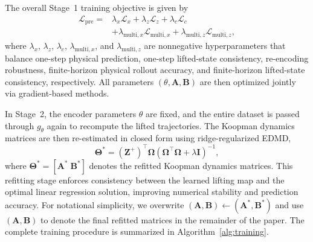 \documentclass[journal]{IEEEtran}
\newcommand{\mA}{\mathbf{A}}
\newcommand{\mB}{\mathbf{B}}
\newcommand{\mZ}{\mathbf{Z}}
\newcommand{\mI}{\mathbf{I}}
\newcommand{\mTheta}{\boldsymbol{\Theta}}
\newcommand{\mOmega}{\boldsymbol{\Omega}}
\begin{document}
{The overall Stage~1 training objective is given by
\begin{equation}
\begin{split}
    \mathcal{L}_{\mathrm{pre}}
    =
    &\lambda_x \mathcal{L}_x
    +
    \lambda_z \mathcal{L}_z
    +
    \lambda_c \mathcal{L}_c \\
    &+
    \lambda_{\mathrm{multi},x}
    \mathcal{L}_{\mathrm{multi},x}
    +
    \lambda_{\mathrm{multi},z}
    \mathcal{L}_{\mathrm{multi},z},
\end{split}
\label{eq:pretraining_loss}
\end{equation}
where $\lambda_x$, $\lambda_z$, $\lambda_c$, $\lambda_{\mathrm{multi},x}$, and $\lambda_{\mathrm{multi},z}$ are nonnegative hyperparameters that balance one-step physical prediction, one-step lifted-state consistency, re-encoding robustness, finite-horizon physical rollout accuracy, and finite-horizon lifted-state consistency, respectively. All parameters $(\theta, \mA, \mB)$ are then optimized jointly via gradient-based methods.}

In Stage~2, the encoder parameters $\theta$ are fixed, and the entire dataset is passed through $g_\theta$ again to recompute the lifted trajectories. The Koopman dynamics matrices are then re-estimated in closed form using ridge-regularized EDMD,
\begin{equation}
    \mTheta^{*} = (\mZ^{+})^\top \mOmega
    \left(\mOmega^\top \mOmega + \lambda \mI\right)^{-1},
\end{equation}
where $\mTheta^{*} = [\mA^{*}\;\mB^{*}]$ denotes the refitted Koopman dynamics matrices. This refitting stage enforces consistency between the learned lifting map and the optimal linear regression solution, improving numerical stability and prediction accuracy. For notational simplicity, we overwrite
$(\mA,\mB)\leftarrow(\mA^{*},\mB^{*})$ and use $(\mA,\mB)$ to denote the final refitted matrices in the remainder of the paper.
The complete training procedure is summarized in Algorithm~\ref{alg:training}.
\end{document}
